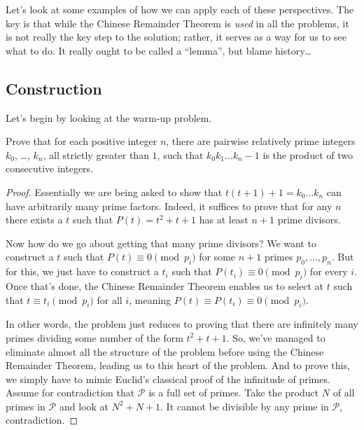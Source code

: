 \documentclass[11pt]{scrartcl}
\begin{document}
Let's look at some examples of how we can apply each of these perspectives.
The key is that while the Chinese Remainder Theorem is \emph{used} in all the problems,
it is not really the key step to the solution;
rather, it serves as a way for us to see what to do.
It really ought to be called a ``lemma'', but blame history\dots

\subsection{Construction}
Let's begin by looking at the warm-up problem.

\begin{example}
  [USAMO 2008/1]
  Prove that for each positive integer $n$,
  there are pairwise relatively prime integers $k_0$, \dots, $k_n$,
  all strictly greater than $1$, such that
  $k_0k_1 \dots k_n - 1$ is the product of two consecutive integers.
\end{example}
\begin{proof}
  Essentially we are being asked to show that $t(t+1)+1 = k_0 \dots k_n$
  can have arbitrarily many prime factors.
  Indeed, it suffices to prove that for any $n$ there exists a $t$
  such that $P(t) = t^2+t+1$ has at least $n+1$ prime divisors.

  Now how do we go about getting that many prime divisors?
  We want to construct a $t$ such that $P(t) \equiv 0 \pmod{p_i}$ for
  some $n+1$ primes $p_0, \dots, p_n$.
  But for this, we just have to construct a $t_i$
  such that $P(t_i) \equiv 0 \pmod{p_i}$ for every $i$.
  Once that's done, the Chinese Remainder Theorem
  enables us to select at $t$ such that $t \equiv t_i \pmod{p_i}$ for all $i$,
  meaning $P(t) \equiv P(t_i) \equiv 0 \pmod{p_i}$.

  In other words, the problem just reduces to proving that
  there are infinitely many primes dividing some number of the form
  $t^2+t+1$.
  So, we've managed to eliminate almost all the structure of the problem before
  using the Chinese Remainder Theorem, leading us to this heart of the problem.
  And to prove this, we simply have to mimic Euclid's classical proof of the infinitude of primes.
  Assume for contradiction that $\mathcal P$ is a full set of primes.
  Take the product $N$ of all primes in $\mathcal P$ and look at $N^2+N+1$.
  It cannot be divisible by any prime in $\mathcal P$, contradiction.
\end{proof}
\end{document}
